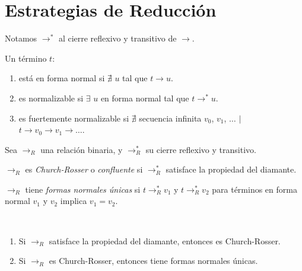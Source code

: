 \documentclass[twoside,a4paper,12pt]{article}
\let\tempone\itemize
\let\temptwo\enditemize
\renewenvironment{itemize}{\tempone\addtolength{\itemsep}{-0.4\baselineskip}}{\temptwo}
\theoremstyle{definition}
\theoremstyle{remark}
\begin{document}
\newpage
\section*{Estrategias de Reducción}

\begin{definicion}{3.1}
  Notamos $\to^*$ al cierre reflexivo y transitivo de $\to$.
\end{definicion}

\begin{definicion}{3.3}
  Un término $t$:
  \begin{enumerate}
  \item está en forma normal si $\nexists$ $u$ tal que $t \to u$.
  \item es normalizable si $\exists$ $u$ en forma normal tal que $t \to^*u$.
  \item es fuertemente normalizable si $\nexists$ secuencia
    infinita $v_0$, $v_1$, $\dots$ $|$ $t\to v_0\to v_1\to\dots$.
  \end{enumerate}
\end{definicion}

\begin{definicion}{3.4}
  Sea $\to_R$ una relación binaria, y $\to^*_R$ su cierre reflexivo y transitivo.
  \begin{itemize}
  \item
  \item $\to_R$ es \emph{Church-Rosser} o \emph{confluente} si $\to^*_R$
    satisface la propiedad del diamante.
  \item $\to_R$ tiene \emph{formas normales únicas} si $t\to^*_R v_1$ y
    $t\to^*_R v_2$ para términos en forma normal $v_1$ y $v_2$ implica
    $v_1=v_2$.
  \end{itemize}
\end{definicion}

\begin{lema}{3.5}
  ~
  \begin{enumerate}
  \item Si $\to_R$ satisface la propiedad del diamante, entonces es
    Church-Rosser.
  \item Si $\to_R$ es Church-Rosser, entonces tiene formas normales únicas.
  \end{enumerate}
\end{lema}
\end{document}

